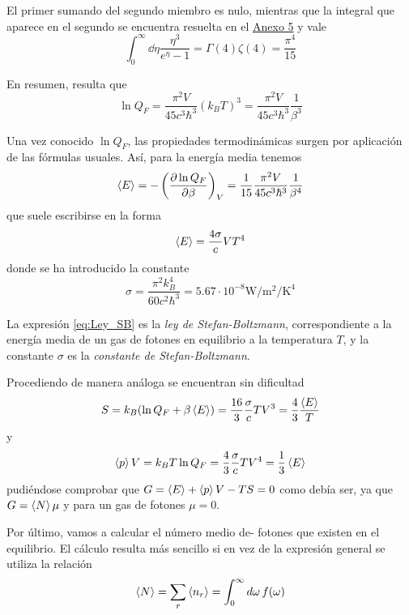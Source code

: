 El primer sumando del segundo miembro es nulo, mientras que la integral que aparece en el segundo se encuentra resuelta en el \hyperref[Anx5]{Anexo 5} y vale
\begin{equation}
	\int_0^\infty \dd{\eta} \frac{\eta^3}{e^{\eta} - 1} = \Gamma(4)\zeta(4) = \frac{\pi^4}{15}
\end{equation}

En resumen, resulta que
\begin{equation}
	\ln Q_F = \frac{\pi^2 V}{45 c^3 \hbar^3} (k_B T)^3 = \frac{\pi^2 V}{45 c^3 \hbar^3} \frac{1}{\beta^3}
\end{equation}

Una vez conocido $\ln Q_F$, las propiedades termodinámicas surgen por aplicación de las fórmulas usuales.
Así, para la energía media tenemos
\begin{equation}
	\expval{E} = - \left( \pdv{\ln Q_F}{\beta} \right)_V = \frac{1}{15} \frac{\pi^2 V}{45 c^3 \hbar^3} \frac{1}{\beta^4}
\end{equation}
que suele escribirse en la forma
\begin{equation}\label{eq:Ley_SB}
	\expval{E} =  \frac{4\sigma}{c} V T^4
\end{equation}
donde se ha introducido la constante
\begin{equation}
	\sigma = \frac{\pi^2 k_B^4}{60 c^2 \hbar^3} = 5.67 \cdot 10^{-8} \si{\watt\per\square\m\per\kelvin\tothe{4}}
\end{equation}

La expresión \eqref{eq:Ley_SB} es la \emph{ley de Stefan-Boltzmann}, correspondiente a la energía media de un gas de fotones en equilibrio a la temperatura $T$, y la constante $\sigma$ es la \emph{constante de Stefan-Boltzmann}.

Procediendo de manera análoga se encuentran sin dificultad
\begin{equation}
	S = k_B (\ln Q_F + \beta\expval{E}) = \frac{16}{3}\frac{\sigma}{c}TV^3 = \frac{4}{3}\frac{\expval{E}}{T}
\end{equation}
y
\begin{equation}
	\expval{p}V = k_B  T \ln Q_F = \frac{4}{3}\frac{\sigma}{c}TV^4 = \frac{1}{3} \expval{E}
\end{equation}
pudiéndose comprobar que $G = \expval{E} + \expval{p}V - TS = 0$ como debía ser, ya que $G = \expval{N}\mu$ y para un gas de fotones $\mu = 0$. 

Por último, vamos a calcular el número medio de- fotones que existen en el equilibrio.
El cálculo resulta más sencillo si en vez de la expresión general se utiliza la relación
\begin{equation}
	\expval{N} = \sum_r \expval{n_r} = \int_0^\infty \dd{\omega} f(\omega)
\end{equation}

